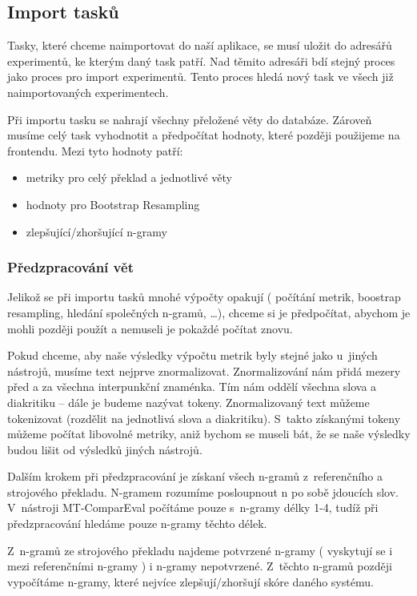 \subsection{Import tasků}
Tasky, které chceme naimportovat do naší aplikace,
  se musí uložit do adresářů experimentů,
  ke kterým daný task patří.
Nad těmito adresáři bdí stejný proces
  jako proces pro import experimentů.
Tento proces hledá nový task ve všech již 
  naimportovaných experimentech.

Při importu tasku se nahrají všechny přeložené věty do databáze.
Zároveň musíme celý task vyhodnotit a předpočítat hodnoty,
  které později použijeme na frontendu.
Mezi tyto hodnoty patří:
\begin{itemize}
	\item metriky pro celý překlad a jednotlivé věty
	\item hodnoty pro Bootstrap Resampling 
	\item zlepšující/zhoršující n-gramy
\end{itemize}

\subsubsection{Předzpracování vět}
Jelikož se při importu tasků mnohé výpočty opakují
  ( počítání metrik, boostrap resampling, hledání společných n-gramů, \dots ),
  chceme si je předpočítat,
  abychom je mohli později použít a nemuseli je pokaždé počítat znovu.

Pokud chceme,
  aby naše výsledky výpočtu metrik byly stejné jako u~jiných nástrojů,
  musíme text nejprve znormalizovat.
Znormalizování nám přidá mezery před a za všechna interpunkční znaménka.
Tím nám oddělí všechna slova a diakritiku -- dále je budeme nazývat tokeny.
Znormalizovaný text můžeme tokenizovat (rozdělit na jednotlivá slova a diakritiku).
S~takto získanými tokeny můžeme počítat libovolné metriky,
  aniž bychom se museli bát,
  že se naše výsledky budou lišit od výsledků jiných nástrojů.

Dalším krokem při předzpracování je získaní všech n-gramů z~referenčního a strojového překladu.
N-gramem rozumíme posloupnout n po sobě jdoucích slov.
V~nástroji \mbox{MT-ComparEval} počítáme pouze s~n-gramy délky 1-4,
  tudíž při předzpracování hledáme pouze n-gramy těchto délek. 

Z~n-gramů ze strojového překladu najdeme potvrzené n-gramy
  ( vyskytují se i mezi referenčními n-gramy )
  i n-gramy nepotvrzené.
Z~těchto n-gramů později vypočítáme n-gramy,
  které nejvíce zlepšují/zhoršují skóre daného systému.
  
